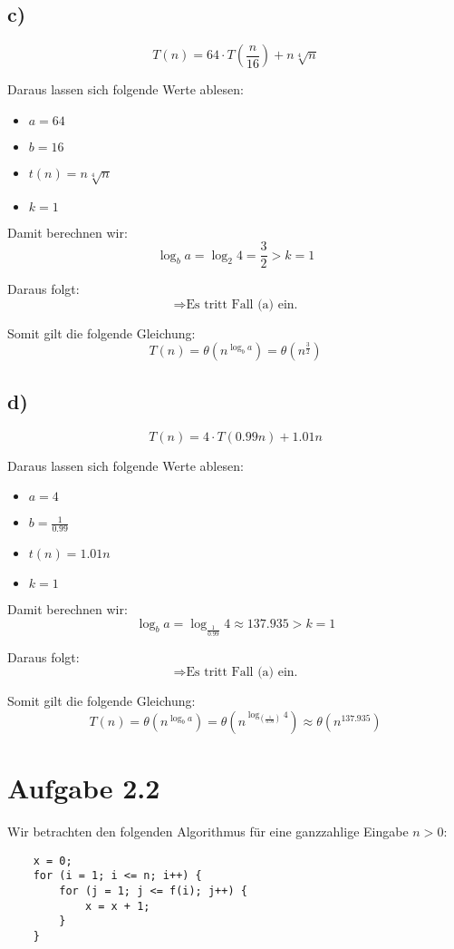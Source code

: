 \documentclass[a4paper]{article}
\begin{document}
\subsection*{c)}
\[ T(n) = 64 \cdot T\left(\frac{n}{16}\right) + n\sqrt[4]{n} \]

Daraus lassen sich folgende Werte ablesen:
\begin{itemize}
    \item $a = 64$
    \item $b = 16$
    \item $t(n) = n \sqrt[4]{n}$
    \item $k = 1$
\end{itemize}

Damit berechnen wir:
\[ \log_b a = \log_2 4 = \frac{3}{2} > k = 1 \]

Daraus folgt:
\[
\Rightarrow \text{Es tritt Fall (a) ein.}
\]

Somit gilt die folgende Gleichung:
\[ T(n) = \theta\left(n^{\log_{b}a}\right) = \theta\left(n^{\frac{3}{2}}\right)\]



\subsection*{d)}
\[ T(n) = 4 \cdot T\left(0.99n\right) + 1.01n \]

Daraus lassen sich folgende Werte ablesen:
\begin{itemize}
    \item $a = 4$
    \item $b = \frac{1}{0.99}$
    \item $t(n) = 1.01n$
    \item $k = 1$
\end{itemize}

Damit berechnen wir:
\[ \log_b a = \log_{\frac{1}{0.99}} 4 \approx 137.935 > k = 1 \]

Daraus folgt:
\[
\Rightarrow \text{Es tritt Fall (a) ein.}
\]

Somit gilt die folgende Gleichung:
\[ T(n) = \theta\left(n^{\log_{b}a}\right) = \theta\left(n^{\log_{(\frac{1}{0.99})}4}\right) \approx \theta\left(n^{137.935}\right)\]

\break

\section*{Aufgabe 2.2}
Wir betrachten den folgenden Algorithmus für eine ganzzahlige Eingabe $n > 0$:
\begin{verbatim}
    x = 0;
    for (i = 1; i <= n; i++) {
        for (j = 1; j <= f(i); j++) {
            x = x + 1;
        }
    }
\end{verbatim}
\end{document}
